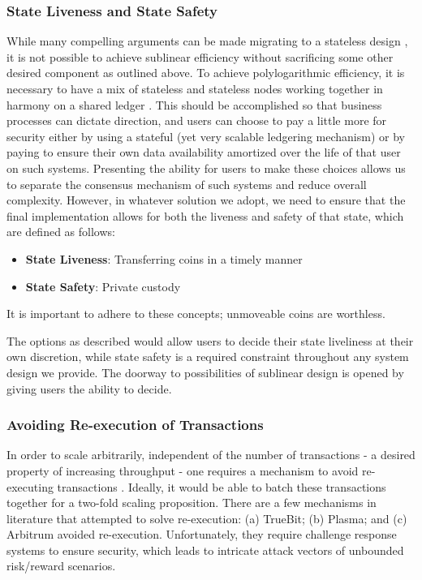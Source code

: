 \documentclass[peerreview]{ieeesyscoin}
\begin{document}
\subsubsection{State Liveness and State Safety}

While many compelling arguments can be made migrating to a stateless design \cite{Hot19}, it is not possible to achieve sublinear efficiency without sacrificing some other desired component as outlined above. To achieve polylogarithmic efficiency, it is necessary to have a mix of stateless and stateless nodes working together in harmony on a shared ledger \cite{Hot19}. This should be accomplished so that business processes can dictate direction, and users can choose to pay a little more for security either by using a stateful (yet very scalable ledgering mechanism) or by paying to ensure their own data availability amortized over the life of that user on such systems. Presenting the ability for users to make these choices allows us to separate the consensus mechanism of such systems and reduce overall complexity. However, in whatever solution we adopt, we need to ensure that the final implementation allows for both the liveness and safety of that state, which are defined as follows:

\begin{itemize}
\item \textbf{State Liveness}: Transferring coins in a timely manner
\item \textbf{State Safety}:  Private custody
\end{itemize}

It is important to adhere to these concepts; unmoveable coins are worthless.

The options as described would allow users to decide their state liveliness at their own discretion, while state safety is a required constraint throughout any system design we provide. The doorway to possibilities of sublinear design is opened by giving users the ability to decide.


\subsubsection{Avoiding Re-execution of Transactions}

In order to scale arbitrarily, independent of the number of transactions - a desired property of increasing throughput - one requires a mechanism to avoid re-executing transactions \cite{Bow18}. Ideally, it would be able to batch these transactions together for a two-fold scaling proposition. There are a few mechanisms in literature that attempted to solve re-execution: (a) TrueBit; (b) Plasma; and (c) Arbitrum avoided re-execution. Unfortunately, they require challenge response systems to ensure security, which leads to intricate attack vectors of unbounded risk/reward scenarios. 
\end{document}
